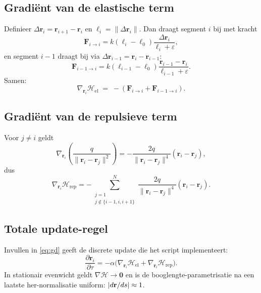 \documentclass[11pt]{article}
\begin{document}
        \subsection{Gradi\"ent van de elastische term}
            Definieer $\Delta \mathbf{r}_i = \mathbf{r}_{i+1}-\mathbf{r}_i$ en $\ell_i=\|\Delta \mathbf{r}_i\|$. Dan draagt segment $i$ bij met kracht
            \[
                \mathbf{F}_{i\to i} = k(\ell_i-\ell_0)\frac{\Delta \mathbf{r}_i}{\ell_i+\varepsilon},
            \]
            en segment $i-1$ draagt bij via $\Delta \mathbf{r}_{i-1}=\mathbf{r}_i-\mathbf{r}_{i-1}$:
            \[
                \mathbf{F}_{i-1\to i} = k(\ell_{i-1}-\ell_0)\frac{\mathbf{r}_{i-1}-\mathbf{r}_{i}}{\ell_{i-1}+\varepsilon}.
            \]
            Samen:
            \begin{equation}
                \nabla_{\mathbf{r}_i}\mathcal{H}_{\mathrm{el}} \;=\; -(\mathbf{F}_{i\to i}+\mathbf{F}_{i-1\to i}).
                \label{eq:grad_el}
            \end{equation}

        \subsection{Gradi\"ent van de repulsieve term}
            Voor $j\neq i$ geldt
            \[
                \nabla_{\mathbf{r}_i}\left(\frac{q}{\|\mathbf{r}_i-\mathbf{r}_j\|^{2}}\right)
                = -\frac{2q}{\|\mathbf{r}_i-\mathbf{r}_j\|^{4}}(\mathbf{r}_i-\mathbf{r}_j),
            \]
            dus
            \begin{equation}
                \nabla_{\mathbf{r}_i}\mathcal{H}_{\mathrm{rep}}
                = -\sum_{\substack{j=1\\ j\notin\{i-1,i,i+1\}}}^{N}
                \frac{2q}{\|\mathbf{r}_i-\mathbf{r}_j\|^{4}}(\mathbf{r}_i-\mathbf{r}_j).
                \label{eq:grad_rep}
            \end{equation}

        \subsection{Totale update-regel}
            Invullen in \eqref{eq:gd} geeft de discrete update die het script implementeert:
            \begin{equation}
                \frac{\partial \mathbf{r}_i}{\partial \tau}
                = -\alpha\Big(\nabla_{\mathbf{r}_i}\mathcal{H}_{\mathrm{el}}+\nabla_{\mathbf{r}_i}\mathcal{H}_{\mathrm{rep}}\Big).
                \label{eq:update}
            \end{equation}
            In stationair evenwicht geldt $\nabla \mathcal{H}\to \mathbf{0}$ en is de booglengte-parametrisatie na een laatste her-normalisatie uniform: $\abs{d\mathbf{r}/ds}\approx 1$.
\end{document}
